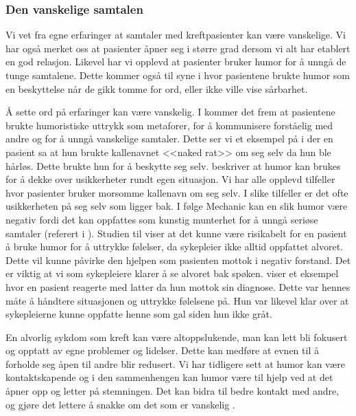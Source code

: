 \subsubsection{Den vanskelige samtalen}

Vi vet fra egne erfaringer at samtaler med kreftpasienter kan være vanskelige.
Vi har også merket oss at pasienter åpner seg i større grad dersom vi alt har
etablert en god relasjon. Likevel har vi opplevd at pasienter bruker humor for
å unngå de tunge samtalene. Dette kommer også til syne i 
hvor pasientene brukte humor som en beskyttelse når de gikk tomme for ord,
eller ikke ville vise sårbarhet.

Å sette ord på erfaringer kan være vanskelig. I  kommer det
frem at pasientene brukte humoristiske uttrykk som metaforer, for å kommunisere
forståelig med andre og for å unngå vanskelige samtaler. Dette ser vi et
eksempel på i  der en pasient sa at hun brukte kallenavnet
<<naked rat>> om seg selv da hun ble hårløs. Dette brukte hun for å beskytte
seg selv.  beskriver at humor kan brukes for å dekke over
usikkerheter rundt egen situasjon. Vi har alle opplevd tilfeller hvor pasienter
bruker morsomme kallenavn om seg selv. I slike tilfeller er det ofte
usikkerheten på seg selv som ligger bak. I følge Mechanic kan en slik humor
være negativ fordi det kan oppfattes som kunstig munterhet for å unngå seriøse
samtaler (referert i ). Studien til 
viser at det kunne være risikabelt for en pasient å bruke humor for å uttrykke
følelser, da sykepleier ikke alltid oppfattet alvoret. Dette vil kunne påvirke
den hjelpen som pasienten mottok i negativ forstand. Det er viktig at vi som
sykepleiere klarer å se alvoret bak spøken.  viser et
eksempel hvor en pasient reagerte med latter da hun mottok sin diagnose. Dette
var hennes måte å håndtere situasjonen og uttrykke følelsene på. Hun var
likevel klar over at sykepleierne kunne oppfatte henne som gal siden hun ikke
gråt.

En alvorlig sykdom som kreft kan være altoppslukende, man kan lett bli fokusert
og opptatt av egne problemer og lidelser. Dette kan medføre at evnen til å
forholde seg åpen til andre blir redusert. Vi har tidligere sett at humor kan
være kontaktskapende og i den sammenhengen kan humor være til hjelp ved at det
åpner opp og letter på stemningen. Det kan bidra til bedre kontakt med andre,
og gjøre det lettere å snakke om det som er vanskelig \cite{eide2008}.

